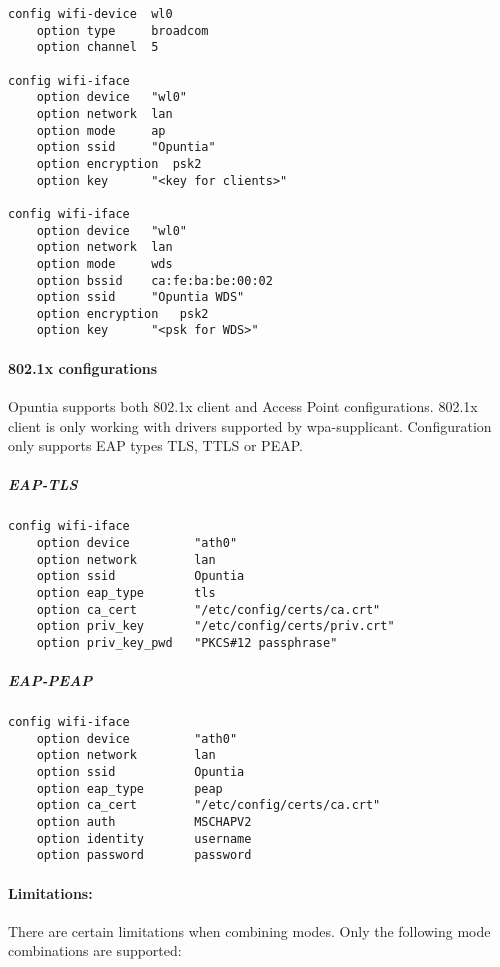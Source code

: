 \begin{Verbatim}
config wifi-device  wl0
    option type     broadcom
    option channel  5

config wifi-iface
    option device   "wl0"
    option network  lan
    option mode     ap
    option ssid     "Opuntia"
    option encryption  psk2
    option key      "<key for clients>"

config wifi-iface
    option device   "wl0"
    option network  lan
    option mode     wds
    option bssid    ca:fe:ba:be:00:02
    option ssid     "Opuntia WDS"
    option encryption	psk2
    option key      "<psk for WDS>"
\end{Verbatim}

\paragraph{802.1x configurations}

Opuntia supports both 802.1x client and Access Point
configurations. 802.1x client is only working with
drivers supported by wpa-supplicant. Configuration
only supports EAP types TLS, TTLS or PEAP.

\subparagraph{EAP-TLS}

\begin{Verbatim}
config wifi-iface
    option device         "ath0"
    option network        lan
    option ssid           Opuntia
    option eap_type       tls
    option ca_cert        "/etc/config/certs/ca.crt"
    option priv_key       "/etc/config/certs/priv.crt"
    option priv_key_pwd   "PKCS#12 passphrase"
\end{Verbatim}

\subparagraph{EAP-PEAP}

\begin{Verbatim}
config wifi-iface
    option device         "ath0"
    option network        lan
    option ssid           Opuntia
    option eap_type       peap
    option ca_cert        "/etc/config/certs/ca.crt"
    option auth           MSCHAPV2
    option identity       username
    option password       password
\end{Verbatim}

\paragraph{Limitations:}

There are certain limitations when combining modes.
Only the following mode combinations are supported:

